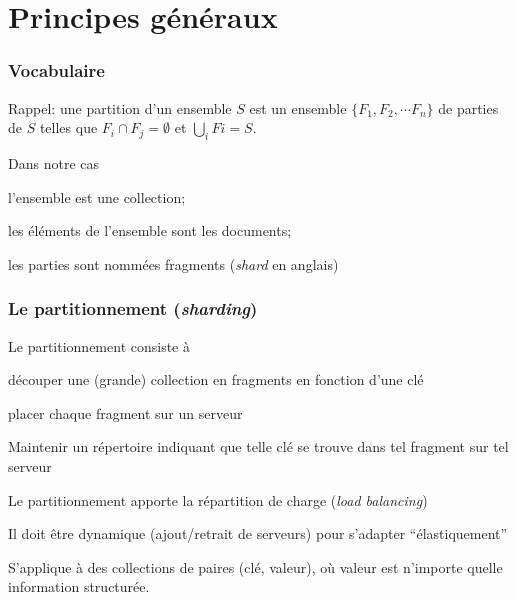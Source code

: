 
\section{Principes généraux}


\begin{frame}
\frametitle{Vocabulaire}

Rappel: une \alert{partition} d'un ensemble $S$ est un ensemble $\{F_1, F_2, \cdots F_n\}$
de parties de $S$ telles que $F_i \cap F_j = \emptyset$ et $\bigcup_i Fi = S$.

\vfill

Dans notre cas
\begin{redbullet}
   \item l'ensemble est une collection;
   \item les éléments de l'ensemble sont les documents;
   \item les parties sont nommées \alert{fragments} (\textit{shard} en anglais)
\end{redbullet}

\end{frame}

\begin{frame}
\frametitle{Le partitionnement (\textit{sharding})}

Le partitionnement consiste à  

\begin{redbullet}
  \item \alert{découper} une (grande) collection
      en \alert{fragments} en fonction d'une \alert{clé}
      \item placer chaque fragment sur un \alert{serveur}
      \item Maintenir un \alert{répertoire} indiquant  que telle \alert{clé} se trouve dans tel \alert{fragment}
          sur tel \alert{serveur}
\end{redbullet}
 
\vfill

Le partitionnement apporte la \alert{répartition de charge} (\textit{load balancing})

\vfill

Il doit être \alert{dynamique} (ajout/retrait de serveurs) pour s'adapter ``élastiquement'' 
 
 \vfill
 
 S'applique à des collections de paires (clé, valeur), où valeur est n'importe quelle information structurée.
\end{frame}




